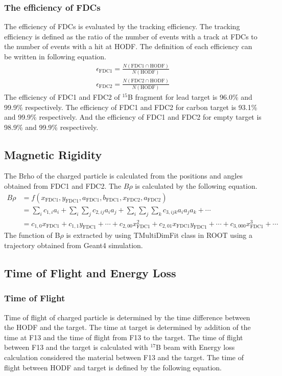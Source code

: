 \subsubsection{The efficiency of FDCs}
The efficiency of FDCs is evaluated by the tracking efficiency. The tracking efficiency is defined as the ratio of the number of events with a track at FDCs to the number of events with a hit at HODF. The definition of each efficiency can be written in following equation.
\begin{align}
\epsilon_{\text{FDC1}} = \frac{N (\text{FDC1} \cap \text{HODF})}{N (\text{HODF})}\\    
\epsilon_{\text{FDC2}} = \frac{N (\text{FDC2} \cap \text{HODF})}{N (\text{HODF})}
\end{align}
The efficiency of FDC1 and FDC2 of $^{15}$B fragment for lead target is 96.0\% and 99.9\% respectively. The efficiency of FDC1 and FDC2 for carbon target is 93.1\% and 99.9\% respectively. And the efficiency of FDC1 and FDC2 for empty target is 98.9\% and 99.9\% respectively.

\subsection{Magnetic Rigidity}
The Brho of the charged particle is calculated from the positions and angles obtained from FDC1 and FDC2. The $B\rho$ is calculated by the following equation.
\begin{align}
    B\rho &= f(x_{\text{FDC1}}, y_{\text{FDC1}}, a_{\text{FDC1}}, b_{\text{FDC1}}, x_{\text{FDC2}}, a_{\text{FDC2}})\\
    &= \sum_{i} c_{1,i} a_i + \sum_{i}\sum_{j} c_{2,ij} a_i a_j + \sum_{i}\sum_{j}\sum_{k} c_{3,ijk} a_i a_j a_k + \cdots \\
    &= c_{1,0} x_{\text{FDC1}} + c_{1,1} y_{\text{FDC1}} + \cdots + c_{2,00} x_{\text{FDC1}}^2 + c_{2,01} x_{\text{FDC1}} y_{\text{FDC1}} + \cdots + c_{3,000} x_{\text{FDC1}}^3 + \cdots
\end{align}
The function of B$\rho$ is extracted by using TMultiDimFit class in ROOT using a trajectory obtained from Geant4 simulation.

\subsection{Time of Flight and Energy Loss}
\subsubsection{Time of Flight}
Time of flight of charged particle is determined by the time difference between the HODF and the target. The time at target is determined by addition of the time at F13 and the time of flight from F13 to the target. The time of flight between F13 and the target is calculated with ${}^{17}$B beam with Energy loss calculation considered the material between F13 and the target. The time of flight between HODF and target is defined by the following equation.

